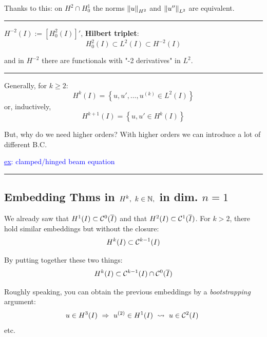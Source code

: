 Thanks to this: on $H^2\cap H^1_0$ the norms $\left\lVert u \right\rVert_{H^2}$ and $\left\lVert u'' \right\rVert_{L^2}$ are equivalent.

\rule{0.31\textwidth}{0.2pt}
\smallskip

$H^{-2}(I):=\left[ H^2_0(I) \right]'$, \textbf{Hilbert triplet}:
\begin{equation*}
H_0^2(I)\subset L^2(I) \subset H^{-2}(I)
\end{equation*}

and in $H^{-2}$ there are functionals with "-2 derivatives" in $L^2$.

\rule{0.31\textwidth}{0.2pt}
\smallskip

Generally, for $k\geq 2$:
\begin{equation*}
H^k(I)=\left\{ u,u',\dots,u^{(k)}\in L^2(I) \right\}
\end{equation*}
or, inductively,
\begin{equation*}
H^{k+1}(I)=\left\{ u,u'\in H^{k}(I) \right\}
\end{equation*}

But, why do we need higher orders? With higher orders we can introduce a lot of different B.C.

\textcolor{blue}{\underline{ex}: clamped/hinged beam equation}

\rule{0.31\textwidth}{0.2pt}


\subsection{\texorpdfstring{\color{red}Embedding Thms in \texorpdfstring{$H^k,\ k\in\mathbb{N},$}{C} in dim. \texorpdfstring{$n=1$}{C}}{}}


We already saw that $H^1(I)\subset \mathcal{C}^0(\overline{I})$ and that $H^2(I)\subset \mathcal{C}^1(\overline{I})$. For $k>2$, there hold similar embeddings but without the closure:
\begin{equation*}
H^k(I)\subset \mathcal{C}^{k-1}(I)
\end{equation*}

By putting together these two things:
\begin{equation*}
H^k(I)\subset \mathcal{C}^{k-1}(I)\cap\mathcal{C}^0(\overline{I})
\end{equation*}

Roughly speaking, you can obtain the previous embeddings by a \emph{bootstrapping} argument:
\begin{equation*}
u\in H^3(I)\ \Rightarrow \ u^{(2)}\in H^1(I) \ \leadsto \ u\in\Cc^2(I)\ 
\end{equation*}
etc.

